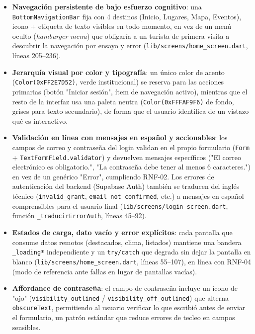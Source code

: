\begin{itemize}
\item \textbf{Navegación persistente de bajo esfuerzo cognitivo}: una
\texttt{BottomNavigationBar} fija con 4 destinos (Inicio, Lugares, Mapa,
Eventos), icono + etiqueta de texto visibles en todo momento, en vez de
un menú oculto (\emph{hamburger menu}) que obligaría a un turista de
primera visita a descubrir la navegación por ensayo y error
(\texttt{lib/screens/home\_screen.dart}, líneas 205--236).
\item \textbf{Jerarquía visual por color y tipografía}: un único color
de acento (\texttt{Color(0xFF2E7D52)}, verde institucional) se reserva
para las acciones primarias (botón "Iniciar sesión", ítem de navegación
activo), mientras que el resto de la interfaz usa una paleta neutra
(\texttt{Color(0xFFFAF9F6)} de fondo, grises para texto secundario), de
forma que el usuario identifica de un vistazo qué es interactivo.
\item \textbf{Validación en línea con mensajes en español y accionables}:
los campos de correo y contraseña del login validan en el propio
formulario (\texttt{Form} + \texttt{TextFormField.validator}) y devuelven
mensajes específicos ("El correo electrónico es obligatorio.", "La
contraseña debe tener al menos 6 caracteres.") en vez de un genérico
"Error", cumpliendo RNF-02. Los errores de autenticación del backend
(Supabase Auth) también se traducen del inglés técnico
(\texttt{invalid\_grant}, \texttt{email not confirmed}, etc.) a mensajes
en español comprensibles para el usuario final
(\texttt{lib/screens/login\_screen.dart}, función
\texttt{\_traducirErrorAuth}, líneas 45--92).
\item \textbf{Estados de carga, dato vacío y error explícitos}: cada
pantalla que consume datos remotos (destacados, clima, listados)
mantiene una bandera \texttt{\_loading*} independiente y un
\texttt{try/catch} que degrada sin dejar la pantalla en blanco
(\texttt{lib/screens/home\_screen.dart}, líneas 55--107), en línea con
RNF-04 (modo de referencia ante fallas en lugar de pantallas vacías).
\item \textbf{Affordance de contraseña}: el campo de contraseña incluye
un ícono de "ojo" (\texttt{visibility\_outlined} /
\texttt{visibility\_off\_outlined}) que alterna \texttt{obscureText},
permitiendo al usuario verificar lo que escribió antes de enviar el
formulario, un patrón estándar que reduce errores de tecleo en campos
sensibles.
\end{itemize}

